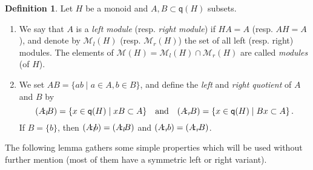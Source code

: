 \documentclass[a4paper]{amsart}
\theoremstyle{definition}
\newtheorem{definition}[theorem]{Definition}
\numberwithin{equation}{section}
\begin{document}
\medskip
\begin{definition} \label{3.1}
Let $H$ be a monoid and $A, B \subset \mathsf q (H)$  subsets.
\begin{enumerate}
\item We say that $A$ is a {\it left module} (resp. {\it right module}) if $HA =
      A$ (resp. $AH = A$), and denote by $\mathcal M_l (H)$ (resp.
      $\mathcal M_r (H)$) the set of all left (resp. right) modules. The
      elements of $\mathcal M (H) = \mathcal M_l (H) \cap \mathcal M_r
      (H)$ are called {\it modules} (of $H$).

\smallskip
\item We set $AB = \{ a b \mid a \in A, b \in B \}$, and define the
      {\it left} and {\it right quotient} of $A$ and $B$ by
      \[
      (A {\negthinspace :_l \negthinspace} B ) = \{ x \in \mathsf q (H) \mid x B \subset A \} \quad
      \text{and} \quad (A {\negthinspace :_r \negthinspace} B ) = \{ x \in \mathsf q (H) \mid  B x
      \subset A \} \,.
      \]
      If $B = \{b\}$, then $(A {\negthinspace :_l \negthinspace} b) = (A {\negthinspace :_l \negthinspace} B)$ and $(A {\negthinspace :_r \negthinspace} b)
      = (A {\negthinspace :_r \negthinspace} B)$.
\end{enumerate}
\end{definition}

\smallskip
The following lemma gathers some simple properties which will be
used without further mention (most of them have a symmetric left or
right variant).
\end{document}
